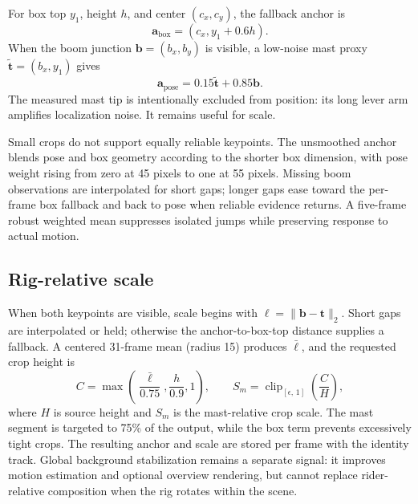 For box top $y_1$, height $h$, and center $(c_x,c_y)$, the fallback anchor is
\begin{equation}
 \mathbf a_{\mathrm{box}}=(c_x,y_1+0.6h).
\end{equation}
When the boom junction $\mathbf b=(b_x,b_y)$ is visible, a low-noise mast proxy
$\tilde{\mathbf t}=(b_x,y_1)$ gives
\begin{equation}
 \mathbf a_{\mathrm{pose}}=0.15\tilde{\mathbf t}+0.85\mathbf b.
 \label{eq:pose-anchor}
\end{equation}
The measured mast tip is intentionally excluded from position: its long lever arm
amplifies localization noise.  It remains useful for scale.

Small crops do not support equally reliable keypoints.  The unsmoothed anchor blends
pose and box geometry according to the shorter box dimension, with pose weight rising
from zero at 45 pixels to one at 55 pixels.  Missing boom observations are interpolated
for short gaps; longer gaps ease toward the per-frame box fallback and back to pose
when reliable evidence returns.  A five-frame robust weighted mean suppresses
isolated jumps while preserving response to actual motion.

\subsection{Rig-relative scale}

When both keypoints are visible, scale begins with
$\ell=\lVert\mathbf b-\mathbf t\rVert_2$.  Short gaps are interpolated or held;
otherwise the anchor-to-box-top distance supplies a fallback.  A centered 31-frame
mean (radius 15) produces $\bar\ell$, and the requested crop height is
\begin{equation}
 C=\max\!\left(\frac{\bar\ell}{0.75},\frac{h}{0.9},1\right),
 \qquad S_m=\operatorname{clip}_{[\epsilon,\,1]}\!\left(\frac{C}{H}\right),
 \label{eq:pose-scale}
\end{equation}
where $H$ is source height and $S_m$ is the mast-relative crop scale.  The mast segment is targeted to 75\% of the output, while
the box term prevents excessively tight crops.  The resulting anchor and scale are
stored per frame with the identity track.  Global background stabilization remains a
separate signal: it improves motion estimation and optional overview rendering, but
cannot replace rider-relative composition when the rig rotates within the scene.
